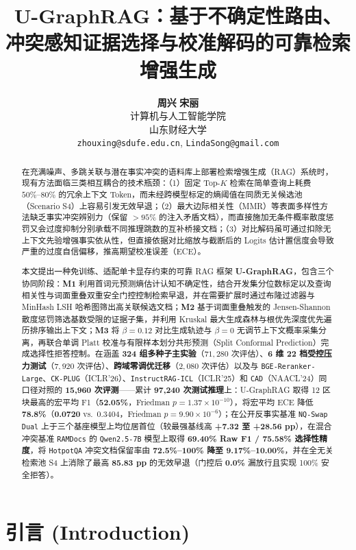 \documentclass[11pt]{article}
\title{\textbf{U-GraphRAG}：基于不确定性路由、冲突感知证据选择与校准解码的可靠检索增强生成}
\author{
  \textbf{周兴} \quad \textbf{宋丽} \\
  计算机与人工智能学院 \\
  山东财经大学 \\
  \texttt{zhouxing@sdufe.edu.cn}, \texttt{LindaSong@gmail.com}
}
\begin{document}
\maketitle

\begin{abstract}
在充满噪声、多跳关联与潜在事实冲突的语料库上部署检索增强生成（RAG）系统时，现有方法面临三类相互耦合的技术瓶颈：（1）固定 Top-$K$ 检索在简单查询上耗费 $50\%\text{--}80\%$ 的冗余上下文 Token，而未经跨模型标定的熵阈值在同质无关候选池（Scenario S4）上容易引发无效早退；（2）最大边际相关性（MMR）等表面多样性方法缺乏事实冲突辨别力（保留 $>95\%$ 的注入矛盾文档），而直接施加无条件概率散度惩罚又会过度抑制分别承载不同推理跳数的互补桥接文档；（3）对比解码虽可通过扣除无上下文先验增强事实依从性，但直接依据对比缩放与截断后的 Logits 估计置信度会导致严重的过度自信偏移，推高期望校准误差（ECE）。

本文提出一种免训练、适配单卡显存约束的可靠 RAG 框架 \textbf{U-GraphRAG}，包含三个协同阶段：\textbf{M1} 利用首词元预测熵估计认知不确定性，结合开发集分位数标定以及查询相关性与词面重叠双重安全门控控制检索早退，并在需要扩展时通过布隆过滤器与 MinHash LSH 哈希图筛出高关联候选文档；\textbf{M2} 基于词面重叠触发的 Jensen-Shannon 散度惩罚筛选基数受限的证据子集，并利用 Kruskal 最大生成森林与根优先深度优先遍历排序输出上下文；\textbf{M3} 将 $\beta=0.12$ 对比生成轨迹与 $\beta=0$ 无调节上下文概率采集分离，再联合单调 Platt 校准与有限样本划分共形预测（Split Conformal Prediction）完成选择性拒答控制。在涵盖 \textbf{324 组多种子主实验}（$71,280$ 次评估）、\textbf{6 维 22 档受控压力测试}（$7,920$ 次评估）、\textbf{跨域零调优迁移}（$2,080$ 次评估）以及与 \texttt{BGE-Reranker-Large}、\texttt{CK-PLUG}（ICLR'26）、\texttt{InstructRAG-ICL}（ICLR'25）和 \texttt{CAD}（NAACL'24）同口径对照的 \textbf{15,960 次评测}——累计 \textbf{97,240 次测试推理}上：U-GraphRAG 取得 12 区块最高的宏平均 F1（\textbf{52.05\%}，Friedman $p = 1.37 \times 10^{-10}$），将宏平均 ECE 降低 \textbf{78.8\%}（\textbf{0.0720} vs.\ 0.3404，Friedman $p = 9.90 \times 10^{-6}$）；在公开反事实基准 \texttt{NQ-Swap Dual} 上于三个基座模型上均位居首位（较最强基线高 \textbf{+7.32 至 +28.56 pp}），在混合冲突基准 \texttt{RAMDocs} 的 \texttt{Qwen2.5-7B} 模型上取得 \textbf{69.40\% Raw F1 / 75.58\% 选择性精度}，将 \texttt{HotpotQA} 冲突文档保留率由 \textbf{72.5\%--100\% 降至 9.17\%--10.00\%}，并在全无关检索池 S4 上消除了最高 \textbf{85.83 pp} 的无效早退（门控后 \textbf{0.0\%} 漏放行且实现 100\% 安全拒答）。
\end{abstract}

\section{引言 (Introduction)}
\end{document}
